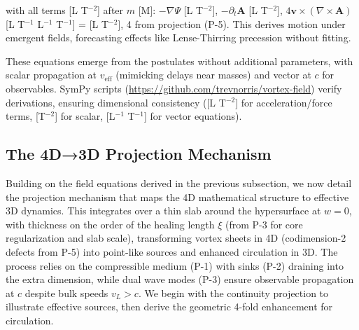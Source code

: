 with all terms [L T$^{-2}$] after $m$ [M]: $-\nabla \Psi$ [L T$^{-2}$], $-\partial_t \mathbf{A}$ [L T$^{-2}$], $4 \mathbf{v} \times (\nabla \times \mathbf{A})$ [L T$^{-1}$ L$^{-1}$ T$^{-1}$] = [L T$^{-2}$], 4 from projection (P-5). This derives motion under emergent fields, forecasting effects like Lense-Thirring precession without fitting.

These equations emerge from the postulates without additional parameters, with scalar propagation at $v_{\text{eff}}$ (mimicking delays near masses) and vector at $c$ for observables. SymPy scripts (\url{https://github.com/trevnorris/vortex-field}) verify derivations, ensuring dimensional consistency ([L T$^{-2}$] for acceleration/force terms, [T$^{-2}$] for scalar, [L$^{-1}$ T$^{-1}$] for vector equations).

\medskip
\noindent
{}
\medskip

\subsection{The 4D→3D Projection Mechanism}

Building on the field equations derived in the previous subsection, we now detail the projection mechanism that maps the 4D mathematical structure to effective 3D dynamics. This integrates over a thin slab around the hypersurface at $w=0$, with thickness on the order of the healing length $\xi$ (from P-3 for core regularization and slab scale), transforming vortex sheets in 4D (codimension-2 defects from P-5) into point-like sources and enhanced circulation in 3D. The process relies on the compressible medium (P-1) with sinks (P-2) draining into the extra dimension, while dual wave modes (P-3) ensure observable propagation at $c$ despite bulk speeds $v_L > c$. We begin with the continuity projection to illustrate effective sources, then derive the geometric 4-fold enhancement for circulation.

